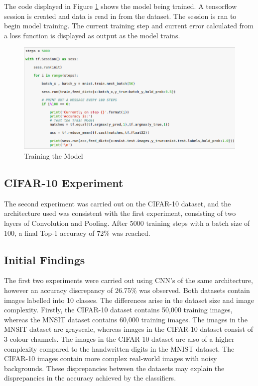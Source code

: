 \documentclass[12pt]{report}
\begin{document}
\begin{flushleft}
The code displayed in Figure \ref{fig:training} shows the model being trained. A tensorflow session is created and data is read in from the dataset. The session is ran to begin model training. The current training step and current error calculated from a loss function is displayed as output as the model trains.
\end{flushleft}

\vspace{0.5cm}
\begin{figure}[h]
	\centering
	\includegraphics[width=12cm]{training}
	\caption{Training the Model}
	\label{fig:training}
\end{figure}

\newpage
\subsection{CIFAR-10 Experiment}

\begin{flushleft}
The second experiment was carried out on the CIFAR-10 dataset, and the architecture used was consistent with the first experiment, consisting of two layers of Convolution and Pooling. After 5000 training steps with a batch size of 100, a final Top-1 accuracy of 72\% was reached.
\end{flushleft}

\subsection{Initial Findings}

The first two experiments were carried out using CNN's of the same architecture, however an accuracy discrepancy of 26.75\% was observed. Both datasets contain images labelled into 10 classes. The differences arise in the dataset size and image complexity. Firstly, the CIFAR-10 dataset contains 50,000 training images, whereas the MNSIT dataset contains 60,000 training images. The images in the MNSIT dataset are grayscale, whereas images in the CIFAR-10 dataset consist of 3 colour channels. The images in the CIFAR-10 dataset are also of a higher complexity compared to the handwritten digits in the MNIST dataset. The CIFAR-10 images contain more complex real-world images with noisy backgrounds. These disprepancies between the datasets may explain the disprepancies in the accuracy achieved by the classifiers.
\end{document}
